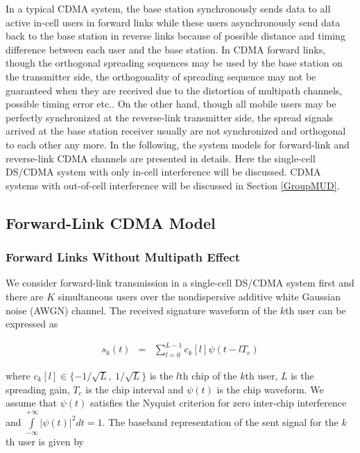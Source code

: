 \documentclass[a4paper,11pt,fleqn]{article}
\begin{document}
In a typical CDMA system, the base station synchronously sends
data to all active in-cell users in forward links while these
users asynchronously send data back to the base station in reverse
links because of possible distance and timing difference between
each user and the base station. In CDMA forward links, though the
orthogonal spreading sequences may be used by the base station on
the transmitter side, the orthogonality of spreading sequence may
not be guaranteed when they are received due to the distortion of
multipath channels, possible timing error etc.. On the other hand,
though all mobile users may be perfectly synchronized at the
reverse-link transmitter side, the spread signals arrived at the
base station receiver usually are not synchronized and orthogonal
to each other any more. In the following, the system models for
forward-link and reverse-link CDMA channels are presented in
details. Here the single-cell DS/CDMA system with only in-cell
interference will be discussed. CDMA systems with out-of-cell
interference will be discussed in Section \ref{GroupMUD}.

\subsection{Forward-Link CDMA Model}

\subsubsection{Forward Links Without Multipath Effect}

We consider forward-link transmission in a single-cell DS/CDMA
system first and there are $K$ simultaneous users  over the
nondispersive additive white Gaussian noise (AWGN) channel. The
received signature waveform of the $k$th user can be expressed as

\begin{equation}
\begin{array}{rcl}
s_k(t)&=&\sum\limits_{l=0}^{L-1}c_k[l]\psi(t-lT_c)
\end{array}
\end{equation}

\noindent where $c_k[l]\in \{-1/\sqrt{L},\ 1/\sqrt{L}\}$ is the
$l$th chip of the $k$th user, $L$ is the spreading gain, $T_c$ is
the chip interval and $\psi(t)$ is the chip waveform. We assume
that $\psi(t)$ satisfies the Nyquist criterion for zero inter-chip
interference and $\int\limits_{-\infty}^{+\infty}|\psi(t)|^2dt=1$.
The baseband representation of the sent signal for the $k$th user
is given by
\end{document}
